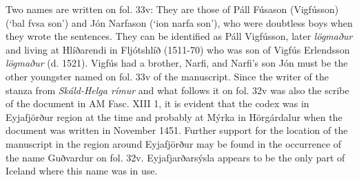\documentclass[11pt,twoside]{article}\makeatletter
\def\ref{}
\begin{document}
Two names are written on fol. 33v: They are those of  {\name Páll Fúsason (Vigfússon)} (‘bal fvsa son’) and  {\name Jón Narfason} (‘ion narfa son’), who were doubtless boys when they wrote the sentences. They can be identified as Páll Vigfússon, later \textit{lögmaður} and living at  {\name Hlíðarendi} in  {\name Fljótshlíð} (1511-70) who was son of  {\name Vigfús Erlendsson} \textit{lögmaður} (d. 1521). Vigfús had a brother, Narfi, and Narfi’s son Jón must be the other youngster named on fol. 33v of the manuscript. Since the writer of the stanza from \textit{Skáld-Helga rímur} and what follows it on fol. 32v was also the scribe of the document in  {\ref AM Fasc. XIII 1}, it is evident that the codex was in  {\name Eyjafjörður} region at the time and probably at  {\name Mýrka} in  {\name Hörgárdalur} when the document was written in November 1451. Further support for the location of the manuscript in the region around Eyjafjörður may be found in the occurrence of the name Guðvardur on fol. 32v.  {\name Eyjafjarðarsýsla} appears to be the only part of  {\name Iceland} where this name was in use.
\end{document}
